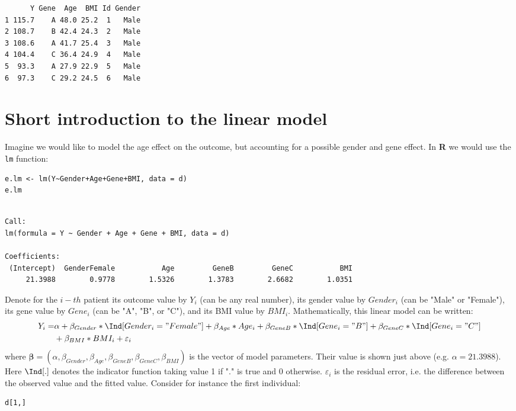 \documentclass[12pt]{article}
\newcommand\Rlogo{\textbf{\textsf{R}}\xspace} %
\begin{document}
\begin{verbatim}
      Y Gene  Age  BMI Id Gender
1 115.7    A 48.0 25.2  1   Male
2 108.7    B 42.4 24.3  2   Male
3 108.6    A 41.7 25.4  3   Male
4 104.4    C 36.4 24.9  4   Male
5  93.3    A 27.9 22.9  5   Male
6  97.3    C 29.2 24.5  6   Male
\end{verbatim}

\clearpage

\section{Short introduction to the linear model}
\label{sec:orgd335574}

Imagine we would like to model the age effect on the outcome, but
accounting for a possible gender and gene effect. In \Rlogo{} we would
use the \texttt{lm} function:
\lstset{language=r,label= ,caption= ,captionpos=b,numbers=none}
\begin{lstlisting}
e.lm <- lm(Y~Gender+Age+Gene+BMI, data = d)
e.lm
\end{lstlisting}

\begin{verbatim}

Call:
lm(formula = Y ~ Gender + Age + Gene + BMI, data = d)

Coefficients:
 (Intercept)  GenderFemale           Age         GeneB         GeneC           BMI  
     21.3988        0.9778        1.5326        1.3783        2.6682        1.0351
\end{verbatim}

Denote for the \(i-th\) patient its outcome value by \(Y_i\) (can be
any real number), its gender value by \(Gender_i\) (can be "Male" or
"Female"), its gene value by \(Gene_i\) (can be "A", "B", or
"C"), and its BMI value by \(BMI_i\). Mathematically, this linear model can be written:
\begin{align*}
Y_i =& \alpha + \beta_{Gender} * \Ind[Gender_i="Female"] + \beta_{Age} * Age_i + \beta_{GeneB} *  \Ind[Gene_i="B"] + \beta_{GeneC} * \Ind[Gene_i="C"] \\
& + \beta_{BMI} * BMI_i + \varepsilon_i
\end{align*}
where \(\boldsymbol{\beta} =
(\alpha,\beta_{Gender},\beta_{Age},\beta_{GeneB},\beta_{GeneC},\beta_{BMI})\) is
the vector of model parameters. Their value is shown just above
(e.g. \(\alpha=21.3988\)). Here \(\Ind[.]\) denotes the indicator
function taking value 1 if "." is true and 0
otherwise. \(\varepsilon_i\) is the residual error, i.e. the
difference between the observed value and the fitted value. Consider
for instance the first individual:
\lstset{language=r,label= ,caption= ,captionpos=b,numbers=none}
\begin{lstlisting}
d[1,]
\end{lstlisting}
\end{document}
